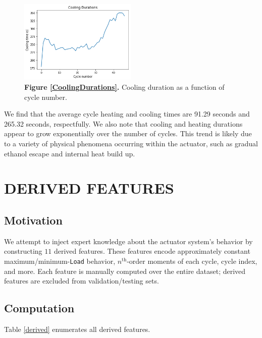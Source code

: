 \documentclass[letterpaper, 10 pt, conference]{ieeeconf}  %
\begin{document}
\label{CoolingDurations}
\begin{figure}[h]
	\centering
	\includegraphics[width=0.5\textwidth]{assets/cooling_durations.png}
    \caption{\textbf{Figure \ref{CoolingDurations}.} Cooling duration as a function of cycle number.}
\end{figure}

We find that the average cycle heating and cooling times are 91.29 seconds and 265.32 seconds, respectfully. We also note that cooling and heating durations appear to grow exponentially over the number of cycles. This trend is likely due to a variety of physical phenomena occurring within the actuator, such as gradual ethanol escape and internal heat build up.

\section{DERIVED FEATURES}

\subsection{Motivation}

We attempt to inject expert knowledge about the actuator system's behavior by constructing $11$ derived features. These features encode approximately constant maximum/minimum-\verb|Load| behavior, $n^\text{th}$-order moments of each cycle, cycle index, and more. Each feature is manually computed over the entire dataset; derived features are excluded from validation/testing sets.

\subsection{Computation}

Table \ref{derived} enumerates all derived features.
\end{document}
